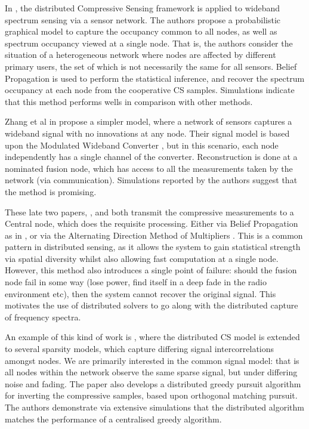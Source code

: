 In \citep{Zhang2011a}, the distributed Compressive Sensing framework is applied to wideband spectrum sensing via a sensor network. The authors propose a probabilistic graphical model to capture the occupancy common to all nodes, as well as spectrum occupancy viewed at a single node. That is, the authors consider the situation of a heterogeneous network where nodes are affected by different primary users, the set of which is not necessarily the same for all sensors. Belief Propagation is used to perform the statistical inference, and recover the spectrum occupancy at each node from the cooperative CS samples. Simulations indicate that this method performs wells in comparison with other methods.

Zhang et al in \cite{Zhang2011b} propose a simpler model, where a network of sensors captures a wideband signal with no innovations at any node. Their signal model is based upon the Modulated Wideband Converter \cite{Mishali2010}, but in this scenario, each node independently has a single channel of the converter. Reconstruction is done at a nominated fusion node, which has access to all the measurements taken by the network (via communication). Simulations reported by the authors suggest that the method is promising. 

These late two papers, \citep{Zhang2011a}, and \cite{Zhang2011b} both transmit the compressive measurements to a Central node, which does the requisite processing. Either via Belief Propagation as in \cite{Zhang2011a}, or via the Alternating Direction Method of Multipliers \cite{Zhang2011b}. This is a common pattern in distributed sensing, as it allows the system to gain statistical strength via spatial diversity whilst also allowing fast computation at a single node. However, this method also introduces a single point of failure: should the fusion node fail in some way (lose power, find itself in a deep fade in the radio environment etc), then the system cannot recover the original signal. This motivates the use of distributed solvers to go along with the distributed capture of frequency spectra.

An example of this kind of work is \cite{Sundman2013a}, where the distributed CS model is extended to several sparsity models, which capture differing signal intercorrelations amongst nodes. We are primarily interested in the common signal model: that is all nodes within the network observe the same sparse signal, but under differing noise and fading. The paper also develops a distributed greedy pursuit algorithm for inverting the compressive samples, based upon orthogonal matching pursuit. The authors demonstrate via extensive simulations that the distributed algorithm matches the performance of a centralised greedy algorithm. 

